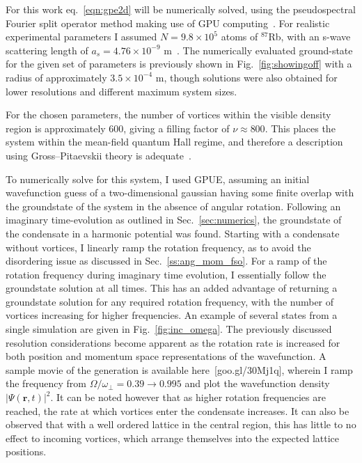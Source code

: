 For this work eq.~\eqref{eqn:gpe2d} will be numerically solved, using the pseudospectral Fourier split operator method making use of GPU computing~\cite{sec:GPUE}. For realistic experimental parameters I assumed  $N=9.8\times 10^5$ atoms of $^{87}$Rb, with an s-wave scattering length of $a_s=4.76\times10^{-9}$ m~\cite{AO:Roberts_prl_1998}. The numerically evaluated ground-state for the given set of parameters is previously shown in Fig.~\ref{fig:showingoff} with a radius of approximately $3.5\times 10^{-4}$ m, though solutions were also obtained for lower resolutions and different maximum system sizes.

For the chosen parameters, the number of vortices within the visible density region is approximately 600, giving a filling factor of $\nu \approx 800 $. This places the system within the mean-field quantum Hall regime, and therefore a description using Gross--Pitaevskii theory is adequate~\cite{Vtx:Schweikhard_prl_2004}.

To numerically solve for this system, I used GPUE, assuming an initial wavefunction guess of a two-dimensional gaussian having some finite overlap with the groundstate of the system in the absence of angular rotation. Following an imaginary time-evolution as outlined in Sec.~\ref{sec:numerics}, the groundstate of the condensate in a harmonic potential was found. Starting with a condensate without vortices, I linearly ramp the rotation frequency, as to avoid the disordering issue as discussed in Sec.~\ref{ss:ang_mom_fso}. For a ramp of the rotation frequency during imaginary time evolution, I essentially follow the groundstate solution at all times. This has an added advantage of returning a groundstate solution for any required rotation frequency, with the number of vortices increasing for higher frequencies. An example of several states from a single simulation are given in Fig.~\ref{fig:inc_omega}. The previously discussed resolution considerations become apparent as the rotation rate is increased for both position and momentum space representations of the wavefunction. A sample movie of the generation is available here~[goo.gl/30Mj1q]\cite{goo.gl/30Mj1q}, wherein I ramp the frequency from $\Omega/\omega_\perp = 0.39 \to 0.995$ and plot the wavefunction density $|\Psi(\mathbf{r},t)|^2$. It can be noted however that as higher rotation frequencies are reached, the rate at which vortices enter the condensate increases. It can also be observed that with a well ordered lattice in the central region, this has little to no effect to incoming vortices, which arrange themselves into the expected lattice positions.


